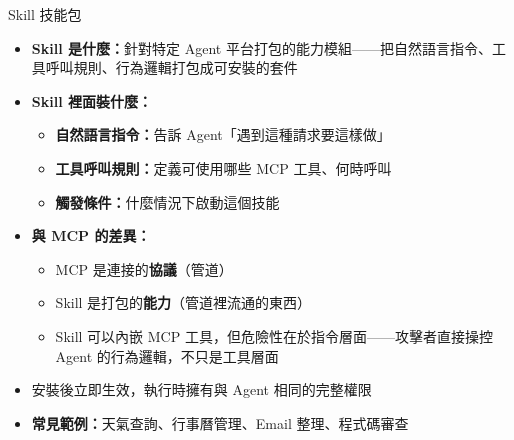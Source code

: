\documentclass[aspectratio=1610]{Common/MyCourseBeamer}
\begin{document}
\begin{frame}[allowframebreaks=0.85]{Skill 技能包}

	\begin{itemize}
		\item \textbf{Skill 是什麼：}針對特定 Agent 平台打包的能力模組——把自然語言指令、工具呼叫規則、行為邏輯打包成可安裝的套件

		\item \textbf{Skill 裡面裝什麼：}
			\begin{itemize}
				\item \textbf{自然語言指令：}告訴 Agent「遇到這種請求要這樣做」
				\item \textbf{工具呼叫規則：}定義可使用哪些 MCP 工具、何時呼叫
				\item \textbf{觸發條件：}什麼情況下啟動這個技能
			\end{itemize}

		\framebreak
		\item \textbf{與 MCP 的差異：}
			\begin{itemize}
				\item MCP 是連接的\textbf{協議}（管道）
				\item Skill 是打包的\textbf{能力}（管道裡流通的東西）
				\item Skill 可以內嵌 MCP 工具，但危險性在於\alert{指令層面}——攻擊者直接操控 Agent 的行為邏輯，不只是工具層面
			\end{itemize}

		\item 安裝後立即生效，執行時擁有與 Agent 相同的完整權限
		\item \textbf{常見範例：}天氣查詢、行事曆管理、Email 整理、程式碼審查
	\end{itemize}

\end{frame}
\end{document}
